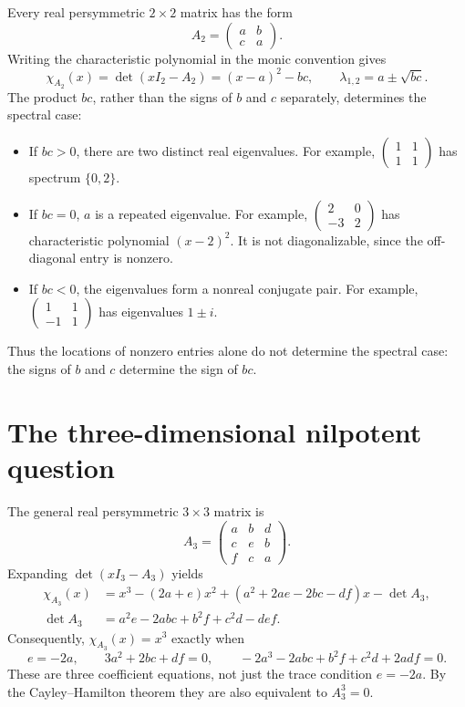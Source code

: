 \documentclass[11pt,a4paper]{article}
\begin{document}
Every real persymmetric $2\times2$ matrix has the form
\[
 A_2=\begin{pmatrix}a&b\\c&a\end{pmatrix}.
\]
Writing the characteristic polynomial in the monic convention gives
\begin{equation}\label{eq:two-by-two}
 \chi_{A_2}(x)=\det(xI_2-A_2)=(x-a)^2-bc,
 \qquad \lambda_{1,2}=a\pm\sqrt{bc}.
\end{equation}
The product $bc$, rather than the signs of $b$ and $c$ separately, determines
the spectral case:
\begin{itemize}
 \item If $bc>0$, there are two distinct real eigenvalues. For example,
 $\left(\begin{smallmatrix}1&1\\1&1\end{smallmatrix}\right)$ has spectrum
 $\{0,2\}$.
 \item If $bc=0$, $a$ is a repeated eigenvalue. For example,
 $\left(\begin{smallmatrix}2&0\\-3&2\end{smallmatrix}\right)$ has
 characteristic polynomial $(x-2)^2$. It is not diagonalizable, since the
 off-diagonal entry is nonzero.
 \item If $bc<0$, the eigenvalues form a nonreal conjugate pair. For example,
 $\left(\begin{smallmatrix}1&1\\-1&1\end{smallmatrix}\right)$ has
 eigenvalues $1\pm i$.
\end{itemize}
Thus the locations of nonzero entries alone do not determine the spectral
case: the signs of $b$ and $c$ determine the sign of $bc$.

\section{The three-dimensional nilpotent question}

The general real persymmetric $3\times3$ matrix is
\begin{equation}\label{eq:three-by-three}
 A_3=\begin{pmatrix}a&b&d\\c&e&b\\f&c&a\end{pmatrix}.
\end{equation}
Expanding $\det(xI_3-A_3)$ yields
\begin{align}\label{eq:three-charpoly}
 \chi_{A_3}(x)
 &=x^3-(2a+e)x^2+(a^2+2ae-2bc-df)x-\det A_3,\\
 \det A_3&=a^2e-2abc+b^2f+c^2d-def.\nonumber
\end{align}
Consequently, $\chi_{A_3}(x)=x^3$ exactly when
\begin{equation}\label{eq:nilpotent-conditions}
 e=-2a,\qquad 3a^2+2bc+df=0,\qquad
 -2a^3-2abc+b^2f+c^2d+2adf=0.
\end{equation}
These are three coefficient equations, not just the trace condition
$e=-2a$. By the Cayley--Hamilton theorem they are also equivalent to
$A_3^3=0$.
\end{document}
